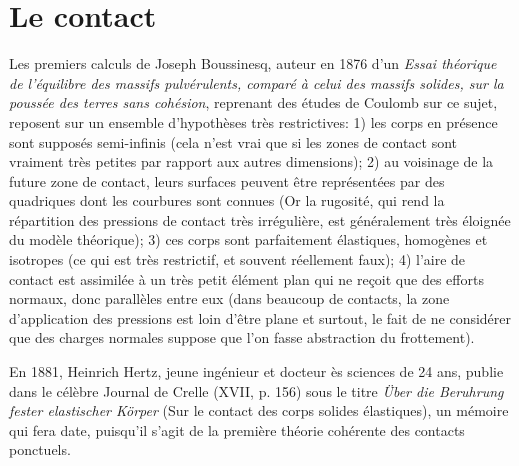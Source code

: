 \medskip
\section{Le contact}\label{Sec-contact}

\medskip
\begin{histoire}%
Les premiers calculs de Joseph Boussinesq, 
auteur en 1876 d'un \emph{Essai théorique de l'équilibre des massifs pulvérulents, comparé à celui des 
massifs solides, sur la poussée des terres sans cohésion}, reprenant des études de 
Coulomb sur ce sujet, reposent sur 
un ensemble d'hypothèses très restrictives: 
1) les corps en présence sont supposés semi-infinis (cela n'est vrai que si les zones de contact sont 
vraiment très petites par rapport aux autres dimensions);
2) au voisinage de la future zone de contact, leurs surfaces peuvent être représentées par des 
quadriques dont les courbures sont connues (Or la rugosité, qui rend la répartition des pressions 
de contact très irrégulière, est généralement très éloignée du modèle théorique);
3) ces corps sont parfaitement élastiques, homogènes et isotropes (ce qui est très restrictif,
et souvent réellement faux);
4) l'aire de contact est assimilée à un très petit élément plan qui ne reçoit que des efforts 
normaux, donc parallèles entre eux (dans beaucoup de contacts, la zone d'application des pressions 
est loin d'être plane et surtout, le fait de ne considérer que des charges normales suppose que l'on 
fasse abstraction du frottement).

\medskip
En 1881, Heinrich Hertz, jeune ingénieur et 
docteur ès sciences de 24 ans, publie dans le célèbre Journal de Crelle (XVII, p. 156) sous le titre 
\emph{\"Uber die Beruhrung fester elastischer Körper}  (Sur le contact des corps solides élastiques), 
un mémoire qui fera date, puisqu'il s'agit de la première théorie cohérente des contacts ponctuels.


\end{histoire}
